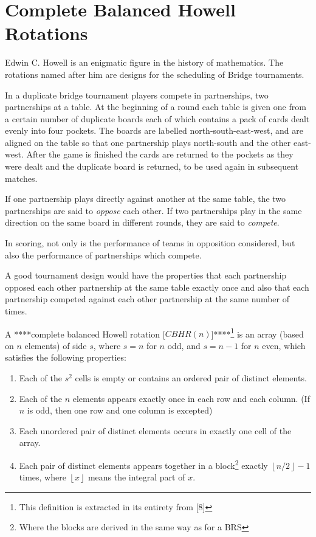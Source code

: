 \documentclass[
  12pt,
  a4paper]{book}
\begin{document}
\hypertarget{complete-balanced-howell-rotations}{%
\section{Complete Balanced Howell
Rotations}\label{complete-balanced-howell-rotations}}

Edwin C. Howell is an enigmatic figure in the history of mathematics.
The rotations named after him are designs for the scheduling of Bridge
tournaments.

In a duplicate bridge tournament players compete in partnerships, two
partnerships at a table. At the beginning of a round each table is given
one from a certain number of duplicate boards each of which contains a
pack of cards dealt evenly into four pockets. The boards are labelled
north-south-east-west, and are aligned on the table so that one
partnership plays north-south and the other east-west. After the game is
finished the cards are returned to the pockets as they were dealt and
the duplicate board is returned, to be used again in subsequent matches.

If one partnership plays directly against another at the same table, the
two partnerships are said to \emph{oppose} each other. If two
partnerships play in the same direction on the same board in different
rounds, they are said to \emph{compete}.

In scoring, not only is the performance of teams in opposition
considered, but also the performance of partnerships which compete.

A good tournament design would have the properties that each partnership
opposed each other partnership at the same table exactly once and also
that each partnership competed against each other partnership at the
same number of times.

A ****complete balanced Howell rotation {[}\(CBHR(n)\){]}****\footnote{This
  definition is extracted in its entirety from {[}8{]}} is an array
(based on \(n\) elements) of side \(s\), where \(s=n\) for \(n\) odd,
and \(s=n-1\) for \(n\) even, which satisfies the following properties:

\begin{enumerate}
\def\labelenumi{\arabic{enumi}.}
\item
  Each of the \(s^2\) cells is empty or contains an ordered pair of
  distinct elements.
\item
  Each of the \(n\) elements appears exactly once in each row and each
  column. (If \(n\) is odd, then one row and one column is excepted)
\item
  Each unordered pair of distinct elements occurs in exactly one cell of
  the array.
\item
  Each pair of distinct elements appears together in a block\footnote{Where
    the blocks are derived in the same way as for a BRS} exactly
  \(\left \lfloor{n/2}\right \rfloor -1\) times, where
  \(\left \lfloor{x}\right \rfloor\) means the integral part of \(x\).
\end{enumerate}
\end{document}
